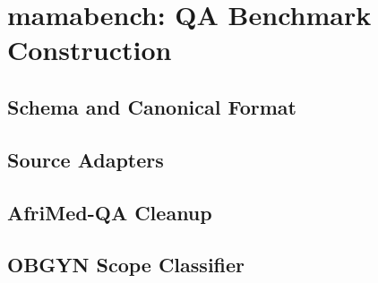\section{mamabench: QA Benchmark Construction}

\subsection{Schema and Canonical Format}

\subsection{Source Adapters}

\subsection{AfriMed-QA Cleanup}

\subsection{OBGYN Scope Classifier}

